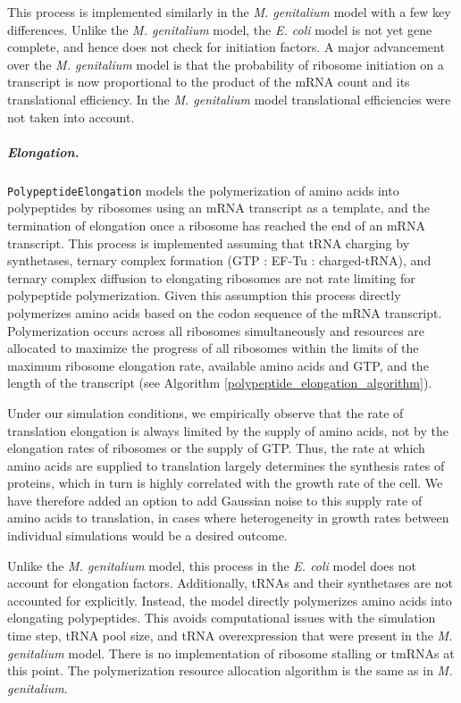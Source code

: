 \documentclass[12pt]{article}
\begin{document}
This process is implemented similarly in the \emph{M. genitalium} model with a few key differences. Unlike the \emph{M. genitalium} model, the \emph{E. coli} model is not yet gene complete, and hence does not check for initiation factors. A major advancement over the \emph{M. genitalium} model is that the probability of ribosome initiation on a transcript is now proportional to the product of the mRNA count and its translational efficiency. In the \emph{M. genitalium} model translational efficiencies were not taken into account.

\subparagraph{Elongation.}
\texttt{PolypeptideElongation} models the polymerization of amino acids into polypeptides by ribosomes using an mRNA transcript as a template, and the termination of elongation once a ribosome has reached the end of an mRNA transcript. This process is implemented assuming that tRNA charging by synthetases, ternary complex formation (GTP : EF-Tu : charged-tRNA), and ternary complex diffusion to elongating ribosomes are not rate limiting for polypeptide polymerization. Given this assumption this process directly polymerizes amino acids based on the codon sequence of the mRNA transcript. Polymerization occurs across all ribosomes simultaneously and resources are allocated to maximize the progress of all ribosomes within the limits of the maximum ribosome elongation rate, available amino acids and GTP, and the length of the transcript (see Algorithm \ref{polypeptide_elongation_algorithm}).

Under our simulation conditions, we empirically observe that the rate of translation elongation is always limited by the supply of amino acids, not by the elongation rates of ribosomes or the supply of GTP. Thus, the rate at which amino acids are supplied to translation largely determines the synthesis rates of proteins, which in turn is highly correlated with the growth rate of the cell. We have therefore added an option to add Gaussian noise to this supply rate of amino acids to translation, in cases where heterogeneity in growth rates between individual simulations would be a desired outcome.

Unlike the \emph{M. genitalium} model, this process in the \emph{E. coli} model does not account for elongation factors. Additionally, tRNAs and their synthetases are not accounted for explicitly. Instead, the model directly polymerizes amino acids into elongating polypeptides. This avoids computational issues with the simulation time step, tRNA pool size, and tRNA overexpression that were present in the \emph{M. genitalium} model. There is no implementation of ribosome stalling or tmRNAs at this point. The polymerization resource allocation algorithm is the same as in \emph{M. genitalium}.\\
\end{document}
